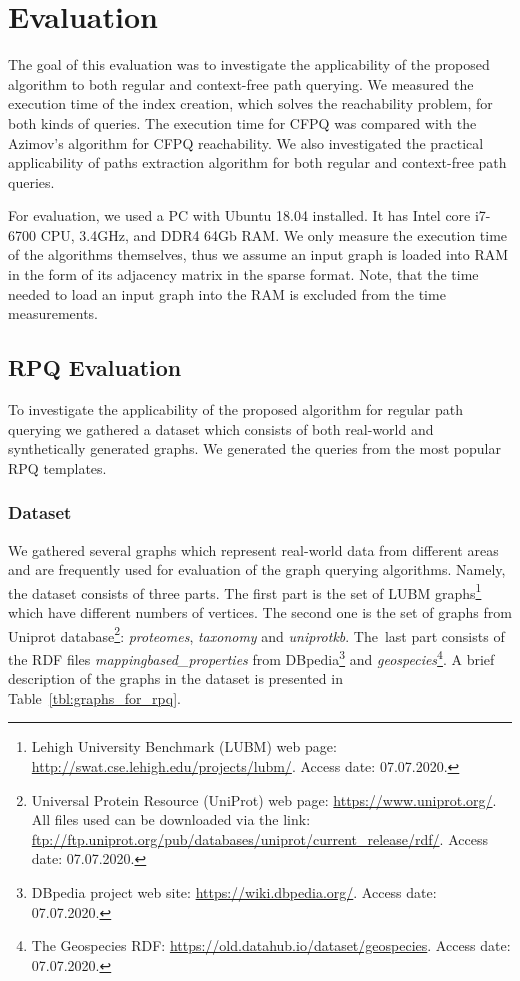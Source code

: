 \section{Evaluation}

The goal of this evaluation was to investigate the applicability of the proposed algorithm to both regular and context-free path querying.
We measured the execution time of the index creation, which solves the reachability problem, for both kinds of queries.
The execution time for CFPQ was compared with the Azimov's algorithm for CFPQ reachability.
We also investigated the practical applicability of paths extraction algorithm for both regular and context-free path queries.

For evaluation, we used a PC with Ubuntu 18.04 installed.
It has Intel core i7-6700 CPU, 3.4GHz, and DDR4 64Gb RAM.
We only measure the execution time of the algorithms themselves, thus we assume an input graph is loaded into RAM in the form of its adjacency matrix in the sparse format.
Note, that the time needed to load an input graph into the RAM is excluded from the time measurements.

\subsection{RPQ Evaluation}

To investigate the applicability of the proposed algorithm for regular path querying we gathered a dataset which consists of both real-world and synthetically generated graphs.
We generated the queries from the most popular RPQ templates.

\subsubsection{Dataset}

We gathered several graphs which represent real-world data from different areas and are frequently used for evaluation of the graph querying algorithms.
Namely, the dataset consists of three parts.
The first part is the set of LUBM graphs\footnote{Lehigh University Benchmark (LUBM) web page: \url{http://swat.cse.lehigh.edu/projects/lubm/}. Access date: 07.07.2020.}~\cite{10.1016/j.websem.2005.06.005} which have different numbers of vertices.
The second one is the set of graphs from Uniprot database\footnote{Universal Protein Resource (UniProt) web page: \url{https://www.uniprot.org/}. All files used can be downloaded via the link: \url{ftp://ftp.uniprot.org/pub/databases/uniprot/current_release/rdf/}. Access date: 07.07.2020.}: \textit{proteomes}, \textit{taxonomy} and \textit{uniprotkb}.
The~last part consists of the RDF files \textit{mappingbased\_properties} from DBpedia\footnote{DBpedia project web site: \url{https://wiki.dbpedia.org/}. Access date: 07.07.2020.} and \textit{geospecies}\footnote{The Geospecies RDF: \url{https://old.datahub.io/dataset/geospecies}. Access date: 07.07.2020.}.
A brief description of the graphs in the dataset is presented in Table~\ref{tbl:graphs_for_rpq}.

